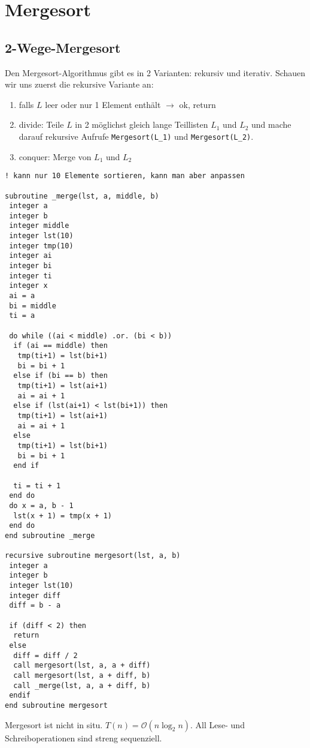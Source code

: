 \section{Mergesort}

\subsection{2-Wege-Mergesort}

Den Mergesort-Algorithmus gibt es in 2 Varianten: rekursiv und iterativ. Schauen wir uns zuerst die rekursive Variante an:
\begin{enumerate}
	\item falls $L$ leer oder nur 1 Element enthält $\to$ ok, return
	\item divide: Teile $L$ in 2 möglichst gleich lange Teillisten $L_1$ und $L_2$ und mache darauf rekursive Aufrufe \texttt{Mergesort(L\_1)} und \texttt{Mergesort(L\_2)}.
	\item conquer: Merge von $L_1$ und $L_2$
\end{enumerate}

\begin{lstlisting}
! kann nur 10 Elemente sortieren, kann man aber anpassen

subroutine _merge(lst, a, middle, b)
 integer a
 integer b
 integer middle
 integer lst(10)
 integer tmp(10)
 integer ai
 integer bi
 integer ti
 integer x
 ai = a
 bi = middle
 ti = a

 do while ((ai < middle) .or. (bi < b))
  if (ai == middle) then
   tmp(ti+1) = lst(bi+1)
   bi = bi + 1
  else if (bi == b) then
   tmp(ti+1) = lst(ai+1)
   ai = ai + 1
  else if (lst(ai+1) < lst(bi+1)) then
   tmp(ti+1) = lst(ai+1)
   ai = ai + 1
  else
   tmp(ti+1) = lst(bi+1)
   bi = bi + 1
  end if
  
  ti = ti + 1
 end do
 do x = a, b - 1
  lst(x + 1) = tmp(x + 1)
 end do
end subroutine _merge

recursive subroutine mergesort(lst, a, b)
 integer a
 integer b
 integer lst(10)
 integer diff
 diff = b - a
 
 if (diff < 2) then
  return
 else
  diff = diff / 2
  call mergesort(lst, a, a + diff)
  call mergesort(lst, a + diff, b)
  call _merge(lst, a, a + diff, b)
 endif
end subroutine mergesort
\end{lstlisting}

Mergesort ist nicht in situ. $T(n)=\mathcal{O}(n\log_2 n)$. All Lese- und Schreiboperationen sind streng sequenziell.

